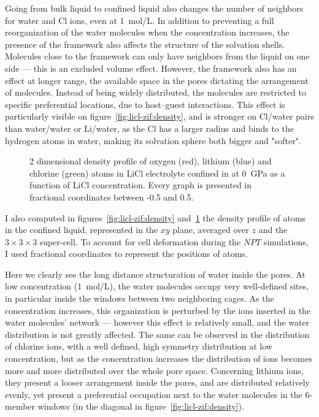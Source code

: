 \documentclass[thesis]{subfiles}
\begin{document}
Going from bulk liquid to confined liquid also changes the number of neighbors
for water and Cl ions, even at \SI{1}{mol/L}. In addition to preventing a full
reorganization of the water molecules when the concentration increases, the
presence of the framework also affects the structure of the solvation shells.
Molecules close to the framework can only have neighbors from the liquid on one
side --- this is an excluded volume effect. However, the framework also has an
effect at longer range, the available space in the pores dictating the
arrangement of molecules. Instead of being widely distributed, the molecules are
restricted to specific preferential locations, due to host--guest interactions.
This effect is particularly visible on figure~\ref{fig:licl-zif:density}, and is
stronger on Cl/water pairs than water/water or Li/water, as the Cl has a larger
radius and binds to the hydrogen atoms in water, making its solvation sphere
both bigger and "softer".

\begin{figure}[p]
    \centering
    
    \caption{2 dimensional density profile of oxygen (red), lithium (blue) and
    chlorine (green) atoms in LiCl electrolyte confined in  at \SI{0}{GPa}
    as a function of LiCl concentration. Every graph is presented in fractional
    coordinates between -0.5 and 0.5.}
    \label{fig:licl-zif:density:all}
\end{figure}


I also computed in figures~\ref{fig:licl-zif:density}
and~\ref{fig:licl-zif:density:all} the density profile of atoms in the confined
liquid, represented in the $xy$ plane, averaged over $z$ and the
$3\times3\times3$ super-cell. To account for cell deformation during the $NPT$
simulations, I used fractional coordinates to represent the positions of atoms.

Here we clearly see the long distance structuration of water inside the 
pores. At low concentration (\SI{1}{mol/L}), the water molecules occupy very
well-defined sites, in particular inside the windows between two neighboring
cages. As the concentration increases, this organization is perturbed by the
ions inserted in the water molecules' network --- however this effect is
relatively small, and the water distribution is not greatly affected. The same
can be observed in the distribution of chlorine ions, with a well defined, high
symmetry distribution at low concentration, but as the concentration increases
the distribution of ions becomes more and more distributed over the whole pore
space. Concerning lithium ions, they present a looser arrangement inside the
pores, and are distributed relatively evenly, yet present a preferential
occupation next to the water molecules in the 6-member windows (in the diagonal
in figure~\ref{fig:licl-zif:density}).
\end{document}

